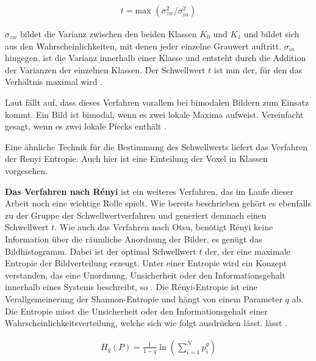 \begin{align}
	t = \text{max }(\sigma_{zw}^{2}/ \sigma_{in}^{2})
\end{align}

$\sigma_{zw}$ bildet die Varianz zwischen den beiden Klassen $K_{0}$ und $K_{1}$
und bildet sich aus den Wahrscheinlichkeiten, mit denen jeder einzelne Grauwert
auftritt. $\sigma_{in}$ hingegen, ist die Varianz innerhalb einer Klasse und
entsteht durch die Addition der Varianzen der einzelnen Klassen. Der Schwellwert
$t$ ist nun der, für den das Verhältnis maximal wird \citep[vgl.][S.~264]{lehmann2013bildverarbeitung}.

Laut \citet[S.~264]{lehmann2013bildverarbeitung} fällt auf, dass dieses Verfahren
vorallem bei bimodalen Bildern zum Einsatz kommt. Ein Bild ist bimodal, wenn es zwei
lokale Maxima aufweist. Vereinfacht gesagt, wenn es zwei lokale Piecks enthält \citep[vgl.][S.~264]{lehmann2013bildverarbeitung}.

Eine ähnliche Technik für die Bestimmung des Schwellwerts liefert das Verfahren
der Renyi Entropie. Auch hier ist eine Einteilung der Voxel in Klassen vorgesehen.
\pagebreak

\textbf{Das Verfahren nach Rényi} ist ein weiteres Verfahren, das im Laufe dieser
Arbeit noch eine wichtige Rolle spielt. Wie bereits beschrieben gehört es
ebenfalls zu der Gruppe der Schwellwertverfahren und generiert demnach einen
Schwellwert $t$. Wie auch das Verfahren nach Otsu, benötigt Rényi keine
Information über die räumliche Anordnung der Bilder, es genügt das Bildhistogramm.
Dabei ist der optimal Schwellwert $t$ der, der eine maximale Entropie der Bildverteilung
erzeugt. Unter einer Entropie wird ein Konzept verstanden, das eine Unordnung,
Unsicherheit oder den Informationsgehalt innerhalb eines Systems beschreibt, so \citet[S.~102]{bein2006}.
Die Rényi-Entropie ist eine Verallgemeinerung der Shannon-Entropie und hängt von
einem Parameter $q$ ab. Die Entropie misst die Unsicherheit oder den
Informationsgehalt einer Wahrscheinlichkeitsverteilung, welche sich wie folgt ausdrücken
lässt. lässt \citep[vgl.][K.~2]{bromiley2004}.

\begin{align}
	\label{equ:renyi}H_{q}(P) = \frac{1}{1-q}\ln \left( \sum_{i=1}^{N}p_{i}^{q}\right)
\end{align}

